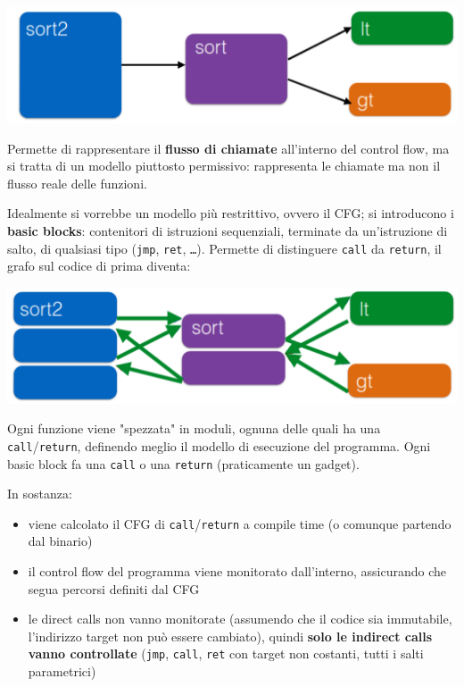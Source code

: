\begin{center}
	\includegraphics[width=0.8\linewidth]{img/cfi/call1}
\end{center}

Permette di rappresentare il \textbf{flusso di chiamate} all'interno del control flow, ma si tratta di un modello piuttosto permissivo: rappresenta le chiamate ma non il flusso reale delle funzioni.

Idealmente si vorrebbe un modello più restrittivo, ovvero il CFG; si introducono i \textbf{basic blocks}: contenitori di istruzioni sequenziali, terminate da un'istruzione di salto, di qualsiasi tipo (\texttt{jmp}, \texttt{ret}, \texttt{\dots}). Permette di distinguere \texttt{call} da \texttt{return}, il grafo sul codice di prima diventa:
\begin{center}
	\includegraphics[width=0.8\linewidth]{img/cfi/call2}
\end{center}

Ogni funzione viene "spezzata" in moduli, ognuna delle quali ha una \texttt{call}/\texttt{return}, definendo meglio il modello di esecuzione del programma. Ogni basic block fa una \texttt{call} o una \texttt{return} (praticamente un gadget). 

In sostanza:
\begin{itemize}
	\item viene calcolato il CFG di \texttt{call}/\texttt{return} a compile time (o comunque partendo dal binario)

	\item il control flow del programma viene monitorato dall'interno, assicurando che segua percorsi definiti dal CFG

	\item le direct calls non vanno monitorate (assumendo che il codice sia immutabile, l'indirizzo target non può essere cambiato), quindi \textbf{solo le indirect calls vanno controllate} (\texttt{jmp}, \texttt{call}, \texttt{ret} con target non costanti, tutti i salti parametrici)
\end{itemize}

